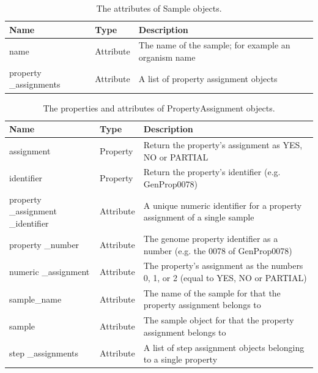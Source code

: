 \begin{table}[!ht]
\centering
\caption{The attributes of Sample objects.}
\label{tab:sampleobject}
\begin{tabular}{|p{2.7cm}|p{2cm}|p{10cm}|}
\hline
\textbf{Name} & \textbf{Type} & \textbf{Description} \\ \hline
name & Attribute & The name of the sample; for example an organism name \\ \hline
property \_assignments & Attribute & A list of property assignment objects \\ \hline
\end{tabular}
\end{table}

\begin{table}[!ht]
\centering
\caption{The properties and attributes of PropertyAssignment objects.}
\label{tab:propertyassignmentobject}
\begin{tabular}{|p{2.7cm}|p{2cm}|p{10cm}|}
\hline
\textbf{Name} & \textbf{Type} & \textbf{Description} \\ \hline
assignment & Property & Return the property's assignment as YES, NO or PARTIAL \\ \hline
identifier & Property & Return the property's identifier (e.g. GenProp0078) \\ \hline
property \_assignment \_identifier & Attribute & A unique numeric identifier for a property assignment of a single sample \\ \hline
property \_number & Attribute & The genome property identifier as a number (e.g. the 0078 of GenProp0078) \\ \hline
numeric \_assignment & Attribute & The property's assignment as the numbers 0, 1, or 2 (equal to YES, NO or PARTIAL) \\ \hline
sample\_name & Attribute & The name of the sample for that the property assignment belongs to \\ \hline
sample & Attribute & The sample object for that the property assignment belongs to \\ \hline
step \_assignments & Attribute & A list of step assignment objects belonging to a single property \\ \hline
\end{tabular}
\end{table}

